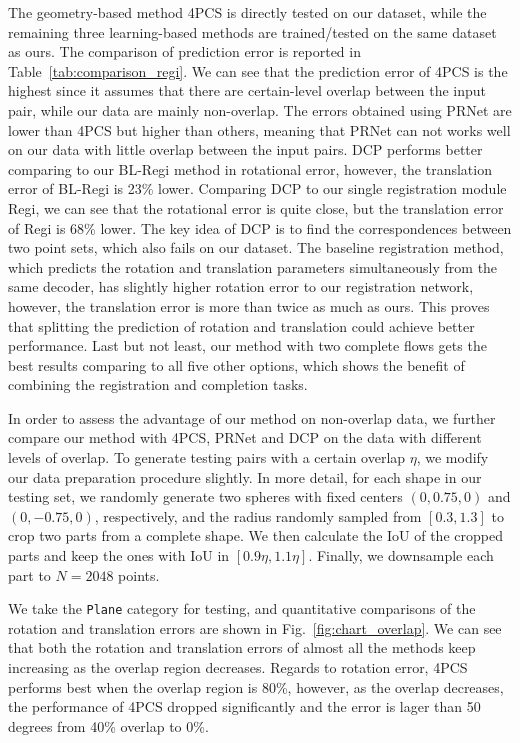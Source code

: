 The geometry-based method 4PCS is directly tested on our dataset, while the remaining three learning-based methods are trained/tested on the same dataset as ours. 
The comparison of prediction error is reported in Table~\ref{tab:comparison_regi}.
We can see that the prediction error of 4PCS is the highest since it assumes that there are certain-level overlap between the input pair, while our data are mainly non-overlap. 
The errors obtained using PRNet are lower than 4PCS but higher than others, meaning that PRNet can not works well on our data with little overlap between the input pairs. DCP performs better comparing to our BL-Regi method in rotational error, however, the translation error of BL-Regi is 23\% lower. Comparing DCP to our single registration module Regi, we can see that the rotational error is quite close, but the translation error of Regi is 68\% lower. The key idea of DCP is to find the correspondences between two point sets, which also fails on our dataset.
The baseline registration method, which predicts the rotation and translation parameters simultaneously from the same decoder, has slightly higher rotation error to our registration network, however, the translation error is more than twice as much as ours. This proves that splitting the prediction of rotation and translation could achieve better performance.
Last but not least, our method with two complete flows gets the best results comparing to all five other options, which shows the benefit of combining the registration and completion tasks.

In order to assess the advantage of our method on non-overlap data, we further compare our method with 4PCS, PRNet and DCP on the data with different levels of overlap.
To generate testing pairs with a certain overlap $\eta$, we modify our data preparation procedure slightly. In more detail, for each shape in our testing set, we randomly generate two spheres with fixed centers $(0, 0.75, 0)$ and $(0, -0.75, 0)$, respectively, and the radius randomly sampled from $[0.3,1.3]$ to crop two parts from a complete shape. We then calculate the IoU of the cropped parts and keep the ones with IoU in $[0.9\eta,1.1\eta]$. Finally, we downsample each part to $N=2048$ points.

We take the \texttt{Plane} category for testing, and quantitative comparisons of the rotation and translation errors are shown in Fig.~\ref{fig:chart_overlap}. 
We can see that both the rotation and translation errors of almost all the methods keep increasing as the overlap region decreases.
Regards to rotation error, 4PCS performs best when the overlap region is 80\%, however, as the overlap decreases, the performance of 4PCS dropped significantly and the error is lager than 50 degrees from 40\% overlap to 0\%. 

